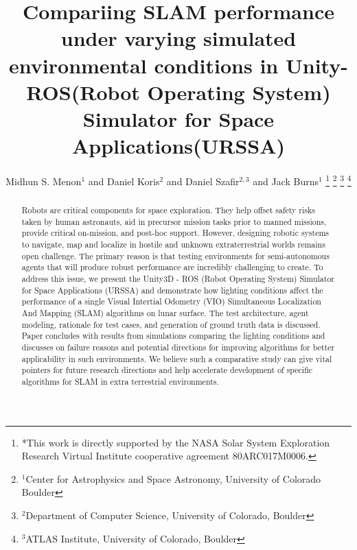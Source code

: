 \documentclass[a4paper, 10pt, conference]{ieeeconf}      %
\title{\LARGE \bf
Compariing SLAM performance under varying simulated environmental conditions in Unity-ROS(Robot Operating System) Simulator for Space Applications(URSSA)
}
\author{Midhun S. Menon$^{1}$ and Daniel Koris$^{2}$ and Daniel Szafir$^{2,3}$ and Jack Burns$^{1}$%
\thanks{*This work is directly supported by the NASA Solar System Exploration Research Virtual Institute cooperative agreement 80ARC017M0006.}%
\thanks{$^{1}$Center for Astrophysics and Space Astronomy, University of Colorado Boulder}%
\thanks{$^{2}$Department of Computer Science, University of Colorado, Boulder}%
\thanks{$^{3}$ATLAS Institute, University of Colorado, Boulder}%
}
\begin{document}

\thispagestyle{empty}
\pagestyle{empty}


\begin{abstract}
Robots are critical components for space exploration. They help offset safety risks taken by human astronauts, aid in precursor mission tasks prior to manned missions, provide critical on-mission, and post-hoc support. However, designing robotic systems to navigate, map and localize in hostile and unknown extraterrestrial worlds remains open challenge. The primary reason is that testing environments for semi-autonomous agents that will produce robust performance are incredibly challenging to create. To address this issue, we present the Unity3D - ROS (Robot Operating System) Simulator for Space Applications (URSSA) and demonstrate how lighting conditions affect the performance of a single Visual Intertial Odometry (VIO) Simultaneous Localization And Mapping (SLAM) algorithms on lunar surface. The test architecture, agent modeling, rationale for test cases, and generation of ground truth data is discussed. Paper concludes with results from simulations comparing the lighting conditions and discusses on failure reasons and potential directions for improving algorithms for better applicability in such environments. We believe such a comparative study can give vital pointers for future research directions and help accelerate development of specific algorithms for SLAM in extra terrestrial environments.

\end{abstract}
\end{document}
